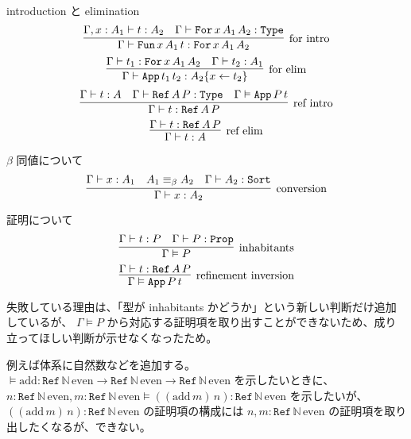 \begin{itembox}[l]{introduction と elimination}
  \[\infer[\text{for intro}]{\Gamma \vdash \texttt{Fun} \, x \, A_1 \, t : \texttt{For} \, x \, A_1 \, A_2}{\Gamma , x : A_1 \vdash t : A_2 & \Gamma \vdash \texttt{For} \, x \, A_1 \, A_2 : \texttt{Type}} \]
  \[\infer[\text{for elim}]{\Gamma \vdash \texttt{App} \, t_1 \, t_2 : A_2\{x \leftarrow t_2\}}{\Gamma \vdash t_1 : \texttt{For} \, x \, A_1 \, A_2 & \Gamma \vdash t_2 : A_1} \]
  \[\infer[\text{ref intro}]{\Gamma \vdash t : \texttt{Ref} \, A \, P}{\Gamma \vdash t : A & \Gamma \vdash \texttt{Ref} \, A \, P : \texttt{Type} & \Gamma \vDash \texttt{App} \, P \, t} \]
  \[\infer[\text{ref elim}]{\Gamma \vdash t : A}{\Gamma \vdash t : \texttt{Ref} \, A \, P} \]
\end{itembox}

\begin{itembox}[l]{\(\beta\) 同値について}
  \[\infer[\text{conversion}]{\Gamma \vdash x : A_2}{\Gamma \vdash x : A_1 & A_1 \equiv_{\beta} A_2 & \Gamma \vdash A_2 : \texttt{Sort}} \]
\end{itembox}

\begin{itembox}[l]{証明について}
  \[\infer[\text{inhabitants}]{\Gamma \vDash P}{\Gamma \vdash t : P & \Gamma \vdash P : \texttt{Prop}}\]
  \[\infer[\text{refinement inversion}]{\Gamma \vDash \texttt{App} \, P \, t}{\Gamma \vdash t : \texttt{Ref} \, A \, P}\]
\end{itembox}

失敗している理由は、「型が inhabitants かどうか」という新しい判断だけ追加しているが、 \(\Gamma \vDash P\) から対応する証明項を取り出すことができないため、成り立ってほしい判断が示せなくなったため。

例えば体系に自然数などを追加する。
\(\vDash \text{add} : \texttt{Ref} \, \mathbb{N} \, \text{even} \to \texttt{Ref} \, \mathbb{N} \, \text{even} \to \texttt{Ref} \, \mathbb{N} \, \text{even}\) を示したいときに、
\(n : \texttt{Ref} \, \mathbb{N} \, \text{even} , m : \texttt{Ref} \, \mathbb{N} \, \text{even} \vDash ((\text{add} \, m) \, n) : \texttt{Ref} \, \mathbb{N} \, \text{even}\) を示したいが、 \(((\text{add} \, m) \, n) : \texttt{Ref} \, \mathbb{N} \, \text{even}\) の証明項の構成には \(n , m : \texttt{Ref} \, \mathbb{N} \, \text{even}\) の証明項を取り出したくなるが、できない。